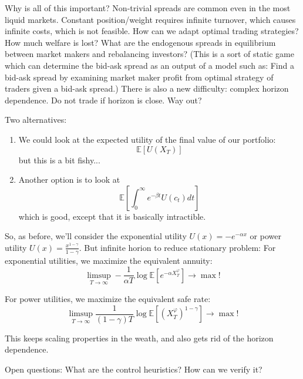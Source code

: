 Why is all of this important? Non-trivial spreads are common even in the most liquid markets. Constant position/weight requires infinite turnover, which causes infinite costs, which is not feasible. How can we adapt optimal trading strategies? How much welfare is lost? What are the endogenous spreads in equilibrium between market makers and rebalancing investors? (This is a sort of static game which can determine the bid-ask spread as an output of a model such as: Find a bid-ask spread by examining market maker profit from optimal strategy of traders given a bid-ask spread.) There is also a new difficulty: complex horizon dependence. Do not trade if horizon is close. Way out?

Two alternatives:
\begin{enumerate}
	\item We could look at the expected utility of the final value of our portfolio:
	\begin{equation}
		\mathbb{E}[U(X_T)]
	\end{equation}
	but this is a bit fishy...
	
	\item Another option is to look at
	\begin{equation}
		\mathbb{E}[ \int_0^\infty e^{-\beta t} U(c_t)dt ] 
	\end{equation}
	which is good, except that it is basically intractible.
\end{enumerate}

So, as before, we'll consider the exponential utility $U(x) = -e^{-\alpha x}$ or power utility $U(x) = \frac{x^{1-\gamma}}{1-\gamma}$. 
But infinite horion to reduce stationary problem:
	For exponential utilities, we maximize the equivalent annuity:
	\begin{equation}
		\limsup_{T\to \infty} - \frac{1}{\alpha T} \log \mathbb{E}\left[e^{-\alpha X_T^\varphi} \right] \to \max!
	\end{equation}
	
	For power utilities, we maximize the equivalent safe rate:
	\begin{equation}
		\limsup_{T\to \infty} \frac{1}{(1-\gamma) T} \log \mathbb{E}\left[ (X^\varphi_T)^{1-\gamma} \right] \to \max!
	\end{equation}

This keeps scaling properties in the weath, and also gets rid of the horizon dependence.

Open questions: What are the control heuristics? How can we verify it?




